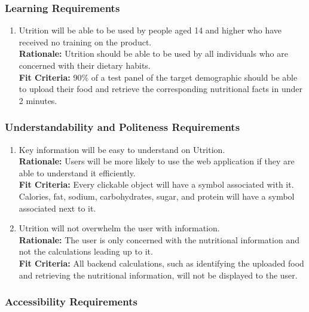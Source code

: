 \documentclass[12pt]{article}
\begin{document}
\subsubsection{Learning Requirements}

\begin{enumerate}[{UH}3. ] 
	\item Utrition will be able to be used by people aged 14 and higher who have received no training on the product.\\
	\textbf{Rationale:} Utrition should be able to be used by all individuals who are concerned with their dietary habits.\\
	\textbf{Fit Criteria:} 90\% of a test panel of the target demographic should be able to upload their food and retrieve the corresponding nutritional facts in under 2 minutes.
\end{enumerate}

\subsubsection{Understandability and Politeness Requirements}

\begin{enumerate}[start=4,label={UH\arabic*.}]
	\item Key information will be easy to understand on Utrition.\\
	\textbf{Rationale:} Users will be more likely to use the web application if they are able to understand it efficiently.\\
	\textbf{Fit Criteria:} Every clickable object will have a symbol associated with it. Calories, fat, sodium, carbohydrates, sugar, and protein will have a symbol associated next to it.
	\item Utrition will not overwhelm the user with information.\\
	\textbf{Rationale:} The user is only concerned with the nutritional information and not the calculations leading up to it.\\
	\textbf{Fit Criteria:} All backend calculations, such as identifying the uploaded food and retrieving the nutritional information, will not be displayed to the user.
\end{enumerate}

\subsubsection{Accessibility Requirements}
\end{document}
